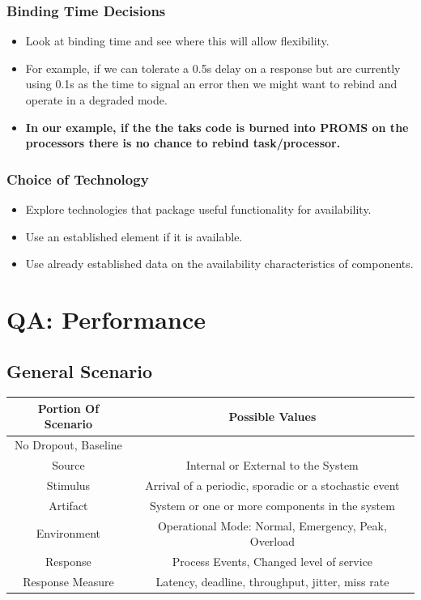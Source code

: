 \documentclass[a4paper]{article}
\begin{document}
\subsubsection{Binding Time Decisions}
\begin{itemize}
\item{Look at binding time and see where this will allow flexibility.}
\item{For example, if we can tolerate a 0.5s delay on a response but are currently using 0.1s as the time to signal an error then we might want to rebind and operate in a degraded mode.}
\item \textbf{In our example, if the the taks code is burned into PROMS on the processors there is no chance to rebind task/processor.}
\end{itemize}
\subsubsection{Choice of Technology}
\begin{itemize}
\item{Explore technologies that package useful functionality for availability.}
\item{Use an established element if it is available.}
\item{Use already established data on the availability characteristics of components.}
\end{itemize}

\newpage
\section{QA: Performance}

\subsection{General Scenario}
\begin{tabular}{||c | c||} 
 \hline
 Portion Of Scenario & Possible Values \\ [0.5ex] 
 \hline\hline
 No Dropout, Baseline &  \\ 
 \hline
 Source & Internal or External to the System \\
 \hline
 Stimulus & Arrival of a periodic, sporadic or a stochastic event \\
 \hline
 Artifact & System or one or more components in the system \\
 \hline
 Environment & Operational Mode: Normal, Emergency, Peak, Overload  \\
 \hline
 Response & Process Events, Changed level of service \\ 
 \hline
 Response Measure & Latency, deadline, throughput, jitter, miss rate \\
 \hline
\end{tabular}
\newline
\newline
\end{document}
